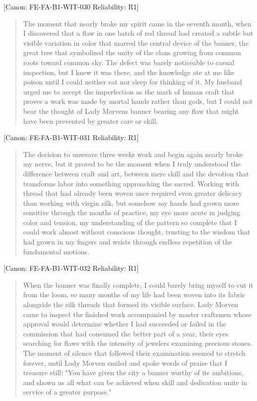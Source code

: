 {[}Canon: FE-FA-B1-WIT-030 \textbar{} Reliability: R1{]}

\begin{quote}
The moment that nearly broke my spirit came in the seventh month, when I
discovered that a flaw in one batch of red thread had created a subtle
but visible variation in color that marred the central device of the
banner, the great tree that symbolized the unity of the clans growing
from common roots toward common sky. The defect was barely noticeable to
casual inspection, but I knew it was there, and the knowledge ate at me
like poison until I could neither eat nor sleep for thinking of it. My
husband urged me to accept the imperfection as the mark of human craft
that proves a work was made by mortal hands rather than gods, but I
could not bear the thought of Lady Morven\textquotesingle s banner
bearing any flaw that might have been prevented by greater care or
skill.
\end{quote}

{[}Canon: FE-FA-B1-WIT-031 \textbar{} Reliability: R1{]}

\begin{quote}
The decision to unweave three weeks\textquotesingle{} work and begin
again nearly broke my nerve, but it proved to be the moment when I truly
understood the difference between craft and art, between mere skill and
the devotion that transforms labor into something approaching the
sacred. Working with thread that had already been woven once required
even greater delicacy than working with virgin silk, but somehow my
hands had grown more sensitive through the months of practice, my eye
more acute in judging color and tension, my understanding of the pattern
so complete that I could work almost without conscious thought, trusting
to the wisdom that had grown in my fingers and wrists through endless
repetition of the fundamental motions.
\end{quote}

{[}Canon: FE-FA-B1-WIT-032 \textbar{} Reliability: R1{]}

\begin{quote}
When the banner was finally complete, I could barely bring myself to cut
it from the loom, so many months of my life had been woven into its
fabric alongside the silk threads that formed its visible surface. Lady
Morven came to inspect the finished work accompanied by master craftsmen
whose approval would determine whether I had succeeded or failed in the
commission that had consumed the better part of a year, their eyes
searching for flaws with the intensity of jewelers examining precious
stones. The moment of silence that followed their examination seemed to
stretch forever, until Lady Morven smiled and spoke words of praise that
I treasure still: "You have given the city a banner worthy of its
ambitions, and shown us all what can be achieved when skill and
dedication unite in service of a greater purpose."
\end{quote}


